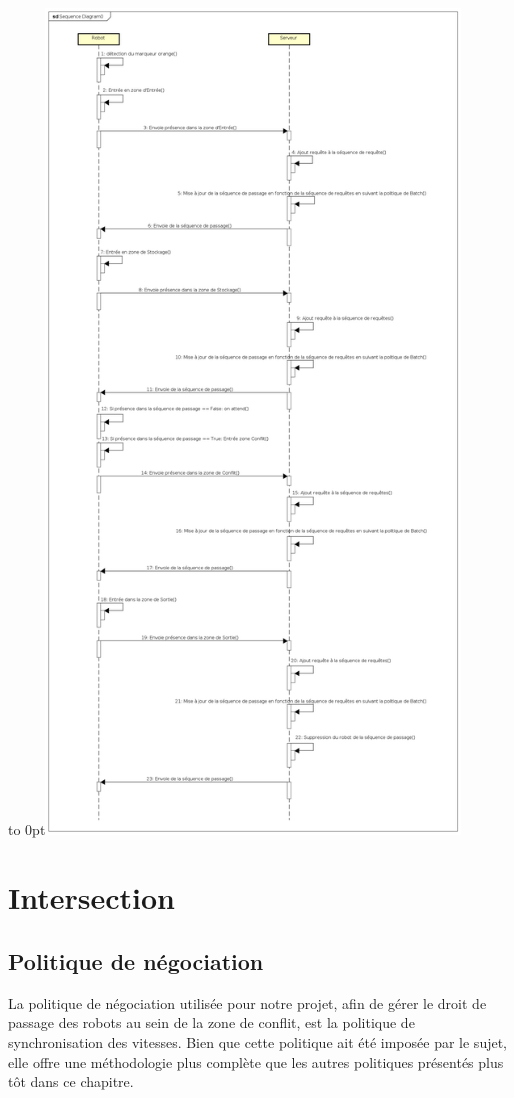 \documentclass[french,a4paper,12pt]{report}
\begin{document}
\hfill\hbox to 0pt{\hss\includegraphics[width=11cm]{diagSeq.png}\hss}\hfill\null\newline


\chapter{Intersection}

\section{Politique de négociation}
La politique de négociation utilisée pour notre projet, afin de gérer le droit de passage des robots au sein de la zone de conflit, est la politique de synchronisation des vitesses. Bien que cette politique ait été imposée par le sujet, elle offre une méthodologie plus complète que les autres politiques présentés plus tôt dans ce chapitre.
\end{document}
